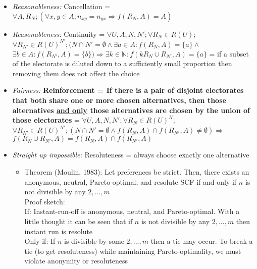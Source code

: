 \documentclass[20pt,a4paper,landscape]{extarticle}
\begin{document}
\begin{flushleft}
\begin{itemize}
\begin{itemize}
    \end{itemize}
\item \textit{Reasonableness:} Cancellation = $\forall A, R_N; (\forall x, y \in A; n_{xy} = n_{yx} \Rightarrow f(R_N, A) = A)$
\item \textit{Reasonableness:} Continuity = $\forall U, A, N, N'; \forall R_N \in R(U);$\\
$\forall R_{N'} \in R(U)^{N'}; (N \cap N' = \emptyset \land \exists a \in A: f(R_N, A) = \{a\} \land$\\
$\exists b \in A: f(R_{N'}, A) = \{b\}) \Rightarrow \exists k \in \mathbb{N}: f(kR_N \cup R_{N'}, A) = \{a\}$ = if a subset of the electorate is diluted down to a sufficiently small proportion then removing them does not affect the choice
\item \textit{Fairness:} \textbf{Reinforcement = If there is a pair of disjoint electorates that both share one or more chosen alternatives, then those alternatives \underline{and only} those alternatives are chosen by the union of those electorates} = $\forall U, A, N, N'; \forall R_N \in R(U)^N;$\\
$\forall R_{N'} \in R(U)^{N'}; (N \cap N' = \emptyset \land f(R_N, A) \cap f(R_{N'}, A) \neq \emptyset) \Rightarrow$\\
$f(R_N \cup R_{N'}, A) = f(R_N, A) \cap f(R_{N'}, A)$
\item \textit{Straight up impossible:} Resoluteness = always choose exactly one alternative
    \begin{itemize}
    \item Theorem (Moulin, 1983): Let preferences be strict. Then, there exists an anonymous, neutral, Pareto-optimal, and resolute SCF if and only if $n$ is not divisible by any $2, ..., m$\\
    Proof sketch:\\
    If: Instant-run-off is anonymous, neutral, and Pareto-optimal. With a little thought it can be seen that if $n$ is not divisible by any $2, ..., m$ then instant run is resolute\\
    Only if: If $n$ is divisible by some $2, ..., m$ then a tie may occur. To break a tie (to get resoluteness) while maintaining Pareto-optimality, we must violate anonymity or resoluteness\\
    \end{itemize}
\end{itemize}

\end{flushleft}
\end{document}
